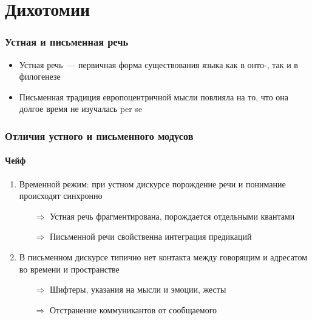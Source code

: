 \section{Дихотомии}
\frame{\tableofcontents[currentsection]}

\begin{frame}
  \frametitle{Устная и письменная речь}

  \begin{itemize}
    \item Устная речь~--- первичная форма существования языка как в онто-, так и в филогенезе
    \item Письменная традиция европоцентричной мысли повлияла на то, что она долгое время не изучалась per se
  \end{itemize}
\end{frame}

\begin{frame}
  \frametitle{Отличия устного и письменного модусов}
  \framesubtitle{Чейф}

  \begin{enumerate}
    \item Временной режим: при устном дискурсе порождение речи и понимание происходят синхронно \begin{itemize}
      \item[$\Rightarrow$] Устная речь фрагментирована, порождается отдельными квантами
      \item[$\Rightarrow$] Письменной речи свойственна интеграция предикаций
    \end{itemize}
    \item<2-> В письменном дискурсе типично нет контакта между говорящим и адресатом во времени и пространстве \begin{itemize}
      \item[$\Rightarrow$] Шифтеры, указания на мысли и эмоции, жесты
      \item[$\Rightarrow$] Отстранение коммуникантов от сообщаемого
    \end{itemize}
  \end{enumerate}
\end{frame}

